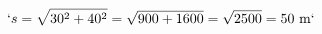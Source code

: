 \documentclass[preview]{standalone}
\begin{document}
\begin{align*}
`s = \sqrt{30^2 + 40^2} = \sqrt{900 + 1600} = \sqrt{2500} = 50 \text{ m}`
\end{align*}
\end{document}
